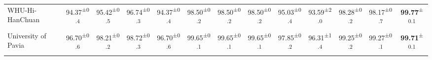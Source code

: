 \begin{table*}[!t]
{\begin{tabular}{l|ccccccc|ccccc}
    WHU-Hi-HanChuan                                & 94.37\textsuperscript{±0.4} & 95.42\textsuperscript{±0.5} & 96.74\textsuperscript{±0.3} & 94.37\textsuperscript{±0.4} & 98.50\textsuperscript{±0.2} & 98.50\textsuperscript{±0.2} & 98.50\textsuperscript{±0.2} & 95.03\textsuperscript{±0.4} & 93.59\textsuperscript{±2.0} & 98.28\textsuperscript{±0.2} & 98.17\textsuperscript{±0.7} & \textbf{99.77}\textsuperscript{±0.1}  \\
    University of Pavia                            & 96.70\textsuperscript{±0.6} & 98.21\textsuperscript{±0.2} & 98.72\textsuperscript{±0.3} & 96.70\textsuperscript{±0.6} & 99.65\textsuperscript{±0.1} & 99.65\textsuperscript{±0.1} & 99.65\textsuperscript{±0.1} & 97.85\textsuperscript{±0.2} & 96.31\textsuperscript{±1.4} & 99.25\textsuperscript{±0.2} & 99.27\textsuperscript{±0.1} & \textbf{99.71}\textsuperscript{±0.1}  \\
    \hline
    \end{tabular}
    }
\end{table*}